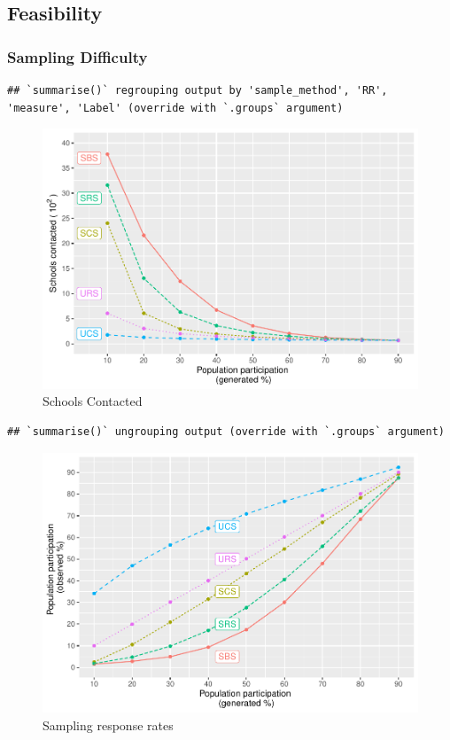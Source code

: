 \documentclass[
  english,
  man,floatsintext]{apa6}
\begin{document}
\hypertarget{feasibility}{%
\subsection{Feasibility}\label{feasibility}}

\hypertarget{sampling-difficulty}{%
\subsubsection{Sampling Difficulty}\label{sampling-difficulty}}

\begin{verbatim}
## `summarise()` regrouping output by 'sample_method', 'RR', 'measure', 'Label' (override with `.groups` argument)
\end{verbatim}

\begin{figure}
\centering
\includegraphics{5---Analysis_files/figure-latex/unnamed-chunk-30-1.pdf}
\caption{\label{fig:unnamed-chunk-30}Schools Contacted}
\end{figure}

\begin{verbatim}
## `summarise()` ungrouping output (override with `.groups` argument)
\end{verbatim}

\begin{figure}
\centering
\includegraphics{5---Analysis_files/figure-latex/unnamed-chunk-31-1.pdf}
\caption{\label{fig:unnamed-chunk-31}Sampling response rates}
\end{figure}
\end{document}
